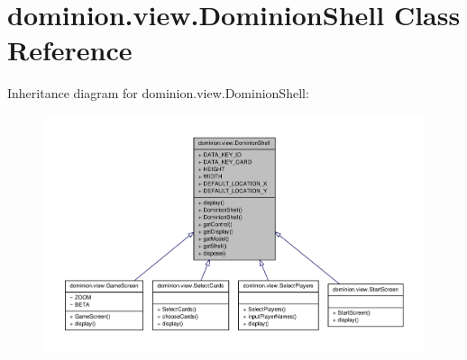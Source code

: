 \hypertarget{classdominion_1_1view_1_1DominionShell}{\section{dominion.\-view.\-Dominion\-Shell \-Class \-Reference}
\label{classdominion_1_1view_1_1DominionShell}
}


\-Inheritance diagram for dominion.\-view.\-Dominion\-Shell\-:
\nopagebreak
\begin{figure}[H]
\begin{center}
\leavevmode
\includegraphics[width=350pt]{classdominion_1_1view_1_1DominionShell__inherit__graph}
\end{center}
\end{figure}

